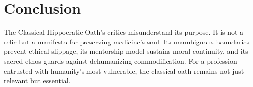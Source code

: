 \documentclass[12pt]{article}
\begin{document}
\section*{Conclusion}

The Classical Hippocratic Oath’s critics misunderstand its purpose. It is not a relic but a manifesto for preserving medicine’s soul. Its unambiguous boundaries prevent ethical slippage, its mentorship model sustains moral continuity, and its sacred ethos guards against dehumanizing commodification. For a profession entrusted with humanity’s most vulnerable, the classical oath remains not just relevant but essential.
\end{document}
